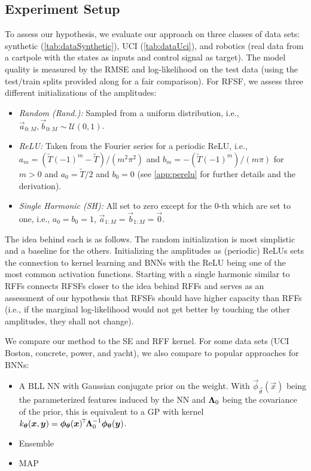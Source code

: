 \subsection{Experiment Setup}  \label{subsec:setup}
To assess our hypothesis, we evaluate our approach on three classes of data sets: synthetic (\autoref{tab:dataSynthetic}), \ac{UCI}\cite{duaUCIMachineLearning2017} (\autoref{tab:dataUci}), and robotics (real data from a cartpole with the states as inputs and control signal as target).
The model quality is measured by the \ac{RMSE} and log-likelihood on the test data (using the test/train splits provided along\cite{galDropoutBayesianApproximation2016} for a fair comparison).
For \ac{RFSF}, we assess three different initializations of the amplitudes:
\begin{itemize}
    \item \emph{Random (Rand.):}       Sampled from a uniform distribution, i.e., $\vec{a}_{0:M}, \vec{b}_{0:M} \sim \mathcal{U}(0, 1)$.
    \item \emph{\ac{ReLU}:}            Taken from the Fourier series for a periodic \ac{ReLU}, i.e., $a_m = (\tilde{T} (-1)^m - \tilde{T}) / (m^2 \pi^2)$ and $b_m = -(\tilde{T} (-1)^m) / (m \pi)$ for $m > 0$ and $a_0 = \tilde{T}/2$ and $b_0 = 0$ (see \autoref{app:perelu} for further details and the derivation).
    \item \emph{Single Harmonic (SH):} All set to zero except for the $0$-th which are set to one, i.e., $a_0 = b_0 = 1$, $\vec{a}_{1:M} = \vec{b}_{1:M} = \vec{0}$.
\end{itemize}
The idea behind each is as follows.
The random initialization is most simplistic and a baseline for the others.
Initializing the amplitudes as (periodic) \acp{ReLU} sets the connection to kernel learning and \acp{BNN} with the \ac{ReLU} being one of the most common activation functions.
Starting with a single harmonic similar to \acp{RFF} connects \acp{RFSF} closer to the idea behind \acp{RFF} and serves as an assessment of our hypothesis that \acp{RFSF} should have higher capacity than \acp{RFF} (i.e., if the marginal log-likelihood would not get better by touching the other amplitudes, they shall not change).

We compare our method to the \ac{SE} and \ac{RFF} kernel.
For some data sets (\ac{UCI} Boston, concrete, power, and yacht), we also compare to popular approaches for \acp{BNN}:
\begin{itemize}
    \item A \ac{BLL} \ac{NN} with Gaussian conjugate prior on the weight. With $\vec{\phi}_{\vec{\theta}}(\vec{x})$ being the parameterized features induced by the \ac{NN} and $\bm{\mathrm{\Lambda}}_0$ being the covariance of the prior, this is equivalent to a \ac{GP} with kernel $k_{\bm{\theta}}(\bm{x}, \bm{y}) = \bm{\phi}_{\bm{\theta}}(\bm{x})^{\!\top\!} \bm{\mathrm{\Lambda}}_0^{-1} \bm{\phi}_{\bm{\theta}}(\bm{y})$\cite{rasmussenGaussianProcessesMachine2006}.
    \item Ensemble  
    \item MAP  
\end{itemize}

